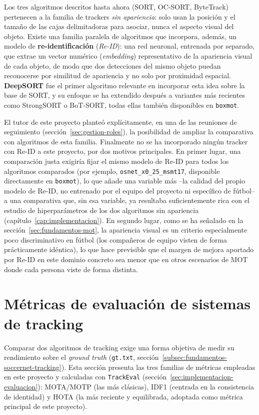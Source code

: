 Los tres algoritmos descritos hasta ahora (SORT, OC-SORT, ByteTrack)
pertenecen a la familia de trackers \emph{sin apariencia}: solo usan la
posición y el tamaño de las cajas delimitadoras para asociar, nunca el
aspecto visual del objeto. Existe una familia paralela de algoritmos que
incorpora, además, un modelo de \textbf{re-identificación} (\emph{Re-ID}):
una red neuronal, entrenada por separado, que extrae un vector numérico
(\emph{embedding}) representativo de la apariencia visual de cada objeto,
de modo que dos detecciones del mismo objeto puedan reconocerse por similitud de
apariencia y no solo por proximidad espacial. \textbf{DeepSORT}
\citep{wojke2017deepsort, ultralytics2026trackingtools} fue el primer algoritmo relevante en incorporar
esta idea sobre la base de SORT, y su enfoque se ha extendido después a
variantes más recientes como StrongSORT o BoT-SORT, todas ellas también
disponibles en \texttt{boxmot}.

El tutor de este proyecto planteó explícitamente, en una de las reuniones
de seguimiento (sección~\ref{sec:gestion-roles}), la posibilidad de ampliar
la comparativa con algoritmos de esta familia. Finalmente no se ha
incorporado ningún tracker con Re-ID a este proyecto, por dos motivos
principales. En primer lugar, una comparación justa exigiría fijar el mismo
modelo de Re-ID para todos los algoritmos comparados (por ejemplo,
\texttt{osnet\_x0\_25\_msmt17}, disponible directamente en
\texttt{boxmot}), lo que añade una variable más --la calidad del propio
modelo de Re-ID, no entrenado por el equipo del proyecto ni específico de
fútbol-- a una comparativa que, sin esa variable, ya resultaba
suficientemente rica con el estudio de hiperparámetros de los dos
algoritmos sin apariencia (capítulo~\ref{cap:implementacion}). En segundo
lugar, como se ha señalado en la sección~\ref{sec:fundamentos-mot}, la
apariencia visual es un criterio especialmente poco discriminativo en
fútbol (los compañeros de equipo visten de forma prácticamente idéntica),
lo que hace previsible que el margen de mejora aportado por Re-ID en este
dominio concreto sea menor que en otros escenarios de MOT donde cada
persona viste de forma distinta.

\section{Métricas de evaluación de sistemas de tracking}
\label{sec:fundamentos-metricas}

Comparar dos algoritmos de tracking exige una forma objetiva de medir su
rendimiento sobre el \emph{ground truth} (\texttt{gt.txt},
sección~\ref{subsec:fundamentos-soccernet-tracking}). Esta sección presenta
las tres familias de métricas empleadas en este proyecto y calculadas con
\texttt{TrackEval} (sección~\ref{sec:implementacion-evaluacion}): MOTA/MOTP
(las más clásicas), IDF1 (centrada en la consistencia de identidad) y HOTA
(la más reciente y equilibrada, adoptada como métrica principal de este
proyecto).

